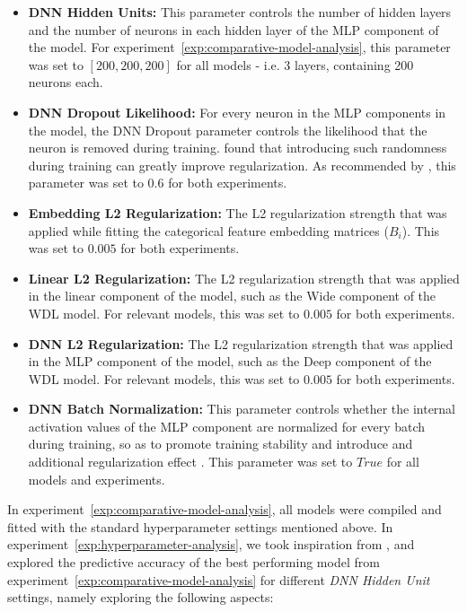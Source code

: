 \documentclass{mldsmsc}
\begin{document}
\begin{itemize}
    \item \textbf{DNN Hidden Units:} This parameter controls the number of hidden layers and the number of neurons
    in each hidden layer of the MLP component of the model. For experiment~\ref{exp:comparative-model-analysis},
    this parameter was set to $[200,200,200]$ for all models - i.e. 3 layers, containing 200 neurons each.

    \item \textbf{DNN Dropout Likelihood:} For every neuron in the MLP components in the model, the DNN Dropout
    parameter controls the likelihood that the neuron is removed during training. \cite{RefWorks:srivastava2014dropout:}
    found that introducing such randomness during training can greatly improve regularization. As recommended
    by \cite{RefWorks:guo2017deepfm:}, this parameter was set to $0.6$ for both experiments.

    \item \textbf{Embedding L2 Regularization:} The L2 regularization strength that was applied while fitting
    the categorical feature embedding matrices ($B_i$). This was set to $0.005$ for both experiments.

    \item \textbf{Linear L2 Regularization:} The L2 regularization strength that was applied in the
    linear component of the model, such as the Wide component of the WDL model. 
    For relevant models, this was set to $0.005$ for both experiments.

    \item \textbf{DNN L2 Regularization:} The L2 regularization strength that was applied in the
    MLP component of the model, such as the Deep component of the WDL model. 
    For relevant models, this was set to $0.005$ for both experiments.

    \item \textbf{DNN Batch Normalization:} This parameter controls whether the internal activation
    values of the MLP component are normalized for every batch during training, so as to
    promote training stability and introduce and additional regularization effect \citep{RefWorks:ioffe2015batch}. This
    parameter was set to $True$ for all models and experiments. 
\end{itemize}

In experiment~\ref{exp:comparative-model-analysis}, all models were compiled and fitted with the
standard hyperparameter settings mentioned above. In experiment~\ref{exp:hyperparameter-analysis},
we took inspiration from \citep{RefWorks:guo2017deepfm:}, and explored the predictive accuracy of the
best performing model from experiment~\ref{exp:comparative-model-analysis} for different
\emph{DNN Hidden Unit} settings, namely exploring the following aspects:
\end{document}
